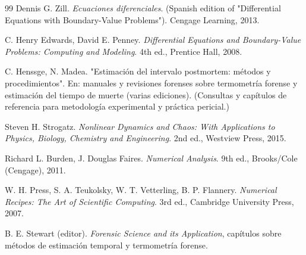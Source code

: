 \documentclass[a4paper,10pt]{article}
\begin{document}
\begin{thebibliography}{99}
	 Dennis G. Zill. \emph{Ecuaciones diferenciales}. (Spanish edition of
		"Differential Equations with Boundary-Value Problems"). Cengage Learning, 2013.

	 C. Henry Edwards, David E. Penney. \emph{Differential
		Equations and Boundary-Value Problems: Computing and Modeling}. 4th ed.,
		Prentice Hall, 2008.

	 C. Henssge, N. Madea. "Estimación del intervalo postmortem: métodos
		y procedimientos". En: manuales y revisiones forenses sobre termometría forense y
		estimación del tiempo de muerte (varias ediciones). (Consultas y capítulos de
		referencia para metodología experimental y práctica pericial.)

	 Steven H. Strogatz. \emph{Nonlinear Dynamics and Chaos: With Applications
		to Physics, Biology, Chemistry and Engineering}. 2nd ed., Westview Press, 2015.

	 Richard L. Burden, J. Douglas Faires. \emph{Numerical Analysis}. 9th ed.,
		Brooks/Cole (Cengage), 2011.

	 W. H. Press, S. A. Teukolsky, W. T. Vetterling, B. P. Flannery.
		\emph{Numerical Recipes: The Art of Scientific Computing}. 3rd ed., Cambridge
		University Press, 2007.

	 B. E. Stewart (editor). \emph{Forensic Science and its Application},
		capítulos sobre métodos de estimación temporal y termometría forense.

\end{thebibliography}


\label{end}
\end{document}

